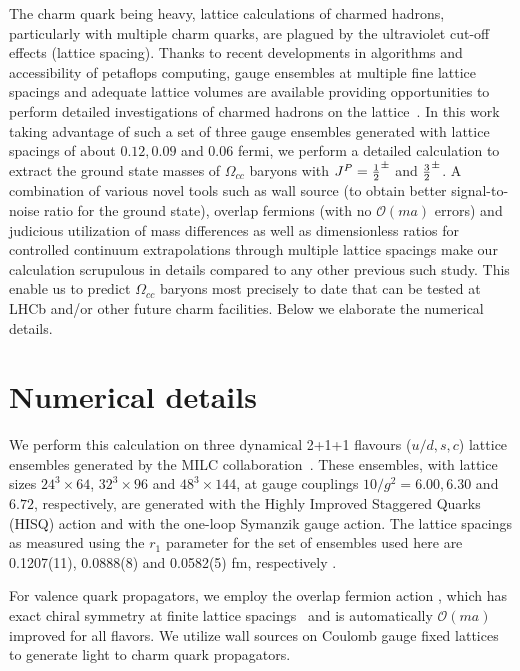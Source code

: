 \documentclass[showkeys,aps,twocolumn,showpacs,preprintnumbers,amsmath,amssymb,prl,letterpaper,floatfix,nofootinbib,superscriptaddress,]{revtex4-1}
\begin{document}
The charm quark being heavy, lattice calculations of charmed hadrons, particularly 
with multiple charm quarks, are plagued by the ultraviolet cut-off effects (lattice spacing). Thanks to recent developments in algorithms and accessibility of petaflops computing, gauge 
ensembles at multiple fine lattice spacings and adequate lattice volumes are available providing opportunities
to perform detailed investigations of charmed hadrons on the lattice~\cite{Briceno:2012wt,Basak:2012py,Basak:2013oya,Namekawa:2013vu,Brown:2014ena,Bali:2015lka,Padmanath:2015jea,Chen:2017kxr,Alexandrou:2017xwd,Mondal:2017nhw,Padmanath:2013zfa,Mathur:2018epb}. In this work taking advantage of such a set of three gauge ensembles generated with lattice spacings of about $0.12, 0.09$ and $0.06$ fermi, we perform a detailed calculation to extract the ground state masses of $\Omega_{cc}$ baryons with $J^{P} = {1\over 2}^{\pm}$ and ${3\over 2}^{\pm}$.
A combination
of various novel tools such as wall source (to obtain better signal-to-noise ratio for the ground state), overlap fermions
(with no ${\mathcal{O}}(ma)$ errors) and judicious utilization of mass differences as well as dimensionless ratios for controlled continuum extrapolations through multiple lattice spacings make our calculation scrupulous in details compared to any other previous such study. This enable us to predict $\Omega_{cc}$ baryons most precisely to date that can be tested at LHCb and/or other future charm facilities. Below we elaborate the numerical details.

\section{\bf{Numerical details}}
We perform this calculation on three dynamical 2+1+1 flavours ($u/d,s,c$) lattice ensembles generated by the MILC collaboration~\cite{Bazavov:2012xda}.
These  ensembles, with lattice sizes  $24^3 \times 64$, $32^3 \times 96$ and $48^3 \times 144$, at gauge couplings $10/g^2 = 6.00, 6.30$ and $6.72$, respectively, are generated with the Highly Improved Staggered Quarks (HISQ) action and with the one-loop Symanzik gauge action. The lattice spacings as measured using the $r_1$
parameter for the set of ensembles used here are 0.1207(11), 0.0888(8) and 0.0582(5) fm, respectively
\cite{Bazavov:2012xda}.


For valence quark propagators, we employ the overlap fermion action \cite{Neuberger:1997fp,Neuberger:1998wv}, which has exact chiral symmetry at finite lattice spacings~\cite{Neuberger:1997fp, Neuberger:1998wv, Luscher:1998pqa}
and is automatically $\mathcal{O}(ma)$ improved for all flavors.
We utilize wall sources on Coulomb gauge fixed lattices
 to generate light to charm quark propagators.
\end{document}
